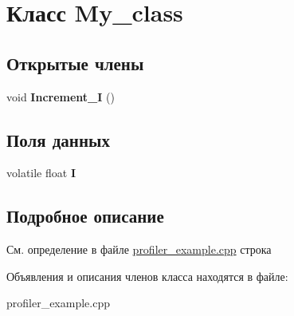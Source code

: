 \hypertarget{class_my__class}{\section{Класс \-My\-\_\-class}
\label{class_my__class}
}
\subsection*{Открытые члены}
\begin{DoxyCompactItemize}
\item 
\hypertarget{class_my__class_a46797d09f0df1bc7622537900c1277c1}{void {\bfseries \-Increment\-\_\-\-I} ()}\label{class_my__class_a46797d09f0df1bc7622537900c1277c1}

\end{DoxyCompactItemize}
\subsection*{Поля данных}
\begin{DoxyCompactItemize}
\item 
\hypertarget{class_my__class_a8ea34b2e963fe95ccac1975beb7fff6a}{volatile float {\bfseries \-I}}\label{class_my__class_a8ea34b2e963fe95ccac1975beb7fff6a}

\end{DoxyCompactItemize}


\subsection{Подробное описание}


См. определение в файле \hyperlink{profiler__example_8cpp_source}{profiler\-\_\-example.\-cpp} строка 



Объявления и описания членов класса находятся в файле\-:\begin{DoxyCompactItemize}
\item 
profiler\-\_\-example.\-cpp\end{DoxyCompactItemize}
